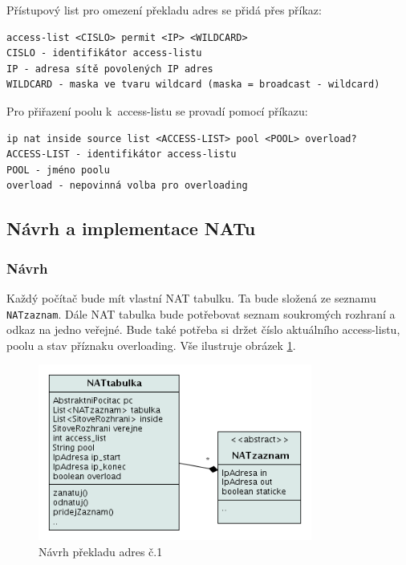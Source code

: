 Přístupový list pro omezení překladu adres se přidá přes příkaz:
\begin{verbatim}
access-list <CISLO> permit <IP> <WILDCARD>
CISLO - identifikátor access-listu
IP - adresa sítě povolených IP adres
WILDCARD - maska ve tvaru wildcard (maska = broadcast - wildcard)
\end{verbatim}

Pro přiřazení poolu k~access-listu se provadí pomocí příkazu:
\begin{verbatim}
ip nat inside source list <ACCESS-LIST> pool <POOL> overload?
ACCESS-LIST - identifikátor access-listu
POOL - jméno poolu
overload - nepovinná volba pro overloading
\end{verbatim} 


\subsection{Návrh a implementace NATu}

\subsubsection{Návrh}
Každý počítač bude mít vlastní NAT tabulku. Ta bude složená ze seznamu \verb|NATzaznam|. Dále NAT tabulka bude potřebovat seznam soukromých rozhraní a odkaz na jedno veřejné. Bude také potřeba si držet číslo aktuálního access-listu, poolu a stav příznaku overloading. Vše ilustruje obrázek \ref{fig:nat_navrh1}.

\begin{figure}[h]
\begin{center}
\includegraphics[width=9cm]{figures/nat_navrh1}
\caption{Návrh překladu adres č.1}
\label{fig:nat_navrh1}
\end{center}
\end{figure}

